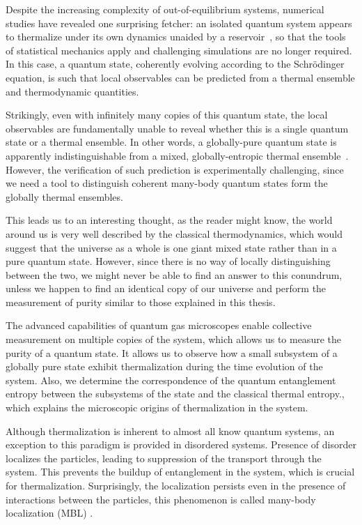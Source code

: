 Despite the increasing complexity of out-of-equilibrium systems, numerical studies have revealed one surprising fetcher: an isolated quantum system appears to thermalize under its own dynamics unaided by a reservoir~\cite{Deutsch1991, Olshanii2008,Eisert2015}, so that the tools of statistical mechanics apply and challenging simulations are no longer required. In this case, a quantum state, coherently evolving according to the Schr\"{o}dinger equation, is such that local observables can be predicted from a thermal ensemble and thermodynamic quantities. 

Strikingly, even with infinitely many copies of this quantum state, the local observables are fundamentally unable to reveal whether this is a single quantum state or a thermal ensemble. In other words, a globally-pure quantum state is apparently indistinguishable from a mixed, globally-entropic thermal ensemble~\cite{Shankar1985, Deutsch1991, SrendickiETH, Olshanii2008}. However, the verification of such prediction is experimentally challenging, since we need a tool to distinguish coherent many-body quantum states form the globally thermal ensembles.

This leads us to an interesting thought, as the reader might know, the world around us is very well described by the classical thermodynamics, which would suggest that the universe as a whole is one giant mixed state rather than in a pure quantum state. However, since there is no way of locally distinguishing between the two, we might never be able to find an answer to this conundrum, unless we happen to find an identical copy of our universe and perform the measurement of purity similar to those explained in this thesis. 

The advanced capabilities of quantum gas microscopes enable collective measurement on multiple copies of the system, which allows us to measure the purity of a quantum state. It allows us to observe how a small subsystem of a globally pure state exhibit thermalization during the time evolution of the system. Also, we determine the correspondence of the quantum entanglement entropy between the subsystems of the state and the classical thermal entropy\cite{Rigol2012, Deutsch2013}., which explains the microscopic origins of thermalization in the system.

Although thermalization is inherent to almost all know quantum systems, an exception to this paradigm is provided in disordered systems. Presence of disorder localizes the particles\cite{ Anderson1958}, leading to suppression of the transport through the system. This prevents the buildup of entanglement in the system, which is crucial for thermalization. Surprisingly, the localization persists even in the presence of interactions between the particles, this phenomenon is called many-body localization (MBL) \cite{ Anderson1958, Gornyi2005, Basko2006, Oganesyan2007}.

